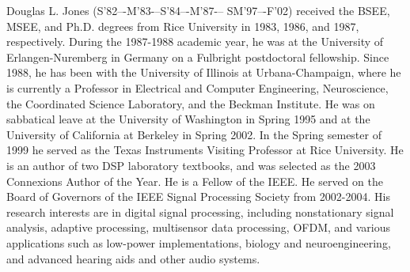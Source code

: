 \documentclass[journal]{IEEEtran}
\begin{document}
\begin{IEEEbiography}{Douglas L. Jones} (S’82–-M’83-–S’84–-M’87-–
SM’97–-F’02) received the BSEE, MSEE, and Ph.D. degrees from Rice University in 1983, 1986, and 1987, respectively. During the 1987-1988 academic year, he was at the University of Erlangen-Nuremberg in Germany on a Fulbright postdoctoral fellowship. Since 1988, he has been with the University of Illinois at Urbana-Champaign, where he is currently a Professor in Electrical and Computer Engineering, Neuroscience, the Coordinated Science Laboratory, and the Beckman Institute. He was on sabbatical leave at the University of Washington in Spring 1995 and at the University of California at Berkeley in Spring 2002. In the Spring semester of 1999 he served as the Texas Instruments Visiting Professor at Rice University. He is an author of two DSP laboratory textbooks, and was selected as the 2003 Connexions Author of the Year. He is a Fellow of the IEEE. He served on the Board of Governors of the IEEE Signal Processing Society from 2002-2004. His research interests are in digital signal processing, including nonstationary signal analysis, adaptive processing, multisensor data processing, OFDM, and various applications such as low-power implementations, biology and neuroengineering, and advanced hearing aids and other audio systems.  
\end{IEEEbiography}
\end{document}
